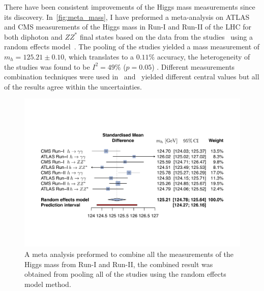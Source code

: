 There have been consistent improvements of the Higgs mass measurements since its discovery. In~\autoref{fig:meta_mass}, I have preformed a meta-analysis on ATLAS and CMS measurements of the Higgs mass in Run-I and Run-II of the LHC for both diphoton and $ZZ^*$ final states based on the data from the studies~\cite{ATLAS:2015yey,ATLAS:2018tdk,CMS:2017dib,CMS:2020xrn} using a random effects model~\cite{aronow_miller_2019}. The pooling of the studies yielded a mass measurement of $ m_h = 125.21 \pm 0.10$, which translates to a $0.11\%$ accuracy, the heterogeneity of the studies was found to be $I^2 =49\%$ ($p=0.05$) . Different measurements combination techniques were used in~\cite{CMS:2020xrn} and~\cite{Zyla:2020zbs} yielded different central values but all of the results agree within the uncertainties. 
\begin{figure}[h!]
	\begin{center}
\includegraphics[width=1.\textwidth]{figures/foreest_pllot_higgs_mass}
		\caption{A meta analysis preformed to combine all the measurements of the Higgs mass from Run-I and Run-II, the combined result was obtained from pooling all of the studies using the random effects model method.\label{fig:meta_mass} }
	\end{center}
\end{figure}
